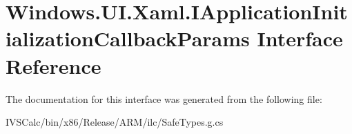 \hypertarget{interface_windows_1_1_u_i_1_1_xaml_1_1_i_application_initialization_callback_params}{}\section{Windows.\+U\+I.\+Xaml.\+I\+Application\+Initialization\+Callback\+Params Interface Reference}
\label{interface_windows_1_1_u_i_1_1_xaml_1_1_i_application_initialization_callback_params}


The documentation for this interface was generated from the following file\+:\begin{DoxyCompactItemize}
\item 
I\+V\+S\+Calc/bin/x86/\+Release/\+A\+R\+M/ilc/Safe\+Types.\+g.\+cs\end{DoxyCompactItemize}
